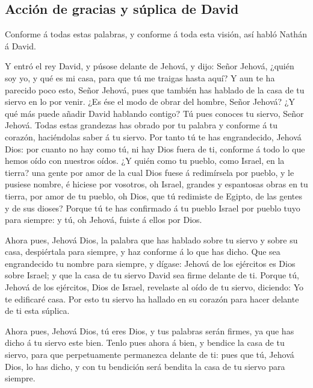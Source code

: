 \hypertarget{acciuxf3n-de-gracias-y-suxfaplica-de-david}{%
\subsection{Acción de gracias y súplica de
David}\label{acciuxf3n-de-gracias-y-suxfaplica-de-david}}

 Conforme á todas estas palabras, y conforme á toda esta
visión, así habló Nathán á David.

 Y entró el rey David, y púsose delante de Jehová, y
dijo: Señor Jehová, ¿quién soy yo, y qué es mi casa, para que tú me
traigas hasta aquí?  Y aun te ha parecido poco esto,
Señor Jehová, pues que también has hablado de la casa de tu siervo en lo
por venir. ¿Es ése el modo de obrar del hombre, Señor Jehová?
 ¿Y qué más puede añadir David hablando contigo? Tú pues
conoces tu siervo, Señor Jehová.  Todas estas grandezas
has obrado por tu palabra y conforme á tu corazón, haciéndolas saber á
tu siervo.  Por tanto tú te has engrandecido, Jehová
Dios: por cuanto no hay como tú, ni hay Dios fuera de ti, conforme á
todo lo que hemos oído con nuestros oídos.  ¿Y quién como
tu pueblo, como Israel, en la tierra? una gente por amor de la cual Dios
fuese á redimírsela por pueblo, y le pusiese nombre, é hiciese por
vosotros, oh Israel, grandes y espantosas obras en tu tierra, por amor
de tu pueblo, oh Dios, que tú redimiste de Egipto, de las gentes y de
sus dioses?  Porque tú te has confirmado á tu pueblo
Israel por pueblo tuyo para siempre: y tú, oh Jehová, fuiste á ellos por
Dios.

 Ahora pues, Jehová Dios, la palabra que has hablado
sobre tu siervo y sobre su casa, despiértala para siempre, y haz
conforme á lo que has dicho.  Que sea engrandecido tu
nombre para siempre, y dígase: Jehová de los ejércitos es Dios sobre
Israel; y que la casa de tu siervo David sea firme delante de ti.
 Porque tú, Jehová de los ejércitos, Dios de Israel,
revelaste al oído de tu siervo, diciendo: Yo te edificaré casa. Por esto
tu siervo ha hallado en su corazón para hacer delante de ti esta
súplica.

 Ahora pues, Jehová Dios, tú eres Dios, y tus palabras
serán firmes, ya que has dicho á tu siervo este bien. 
Tenlo pues ahora á bien, y bendice la casa de tu siervo, para que
perpetuamente permanezca delante de ti: pues que tú, Jehová Dios, lo has
dicho, y con tu bendición será bendita la casa de tu siervo para
siempre.

